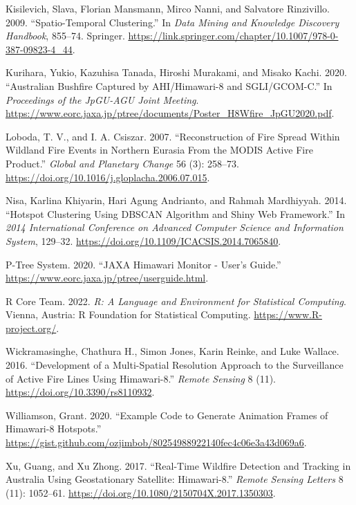 \begin{CSLReferences}{1}{0}
\leavevmode{}%
Kisilevich, Slava, Florian Mansmann, Mirco Nanni, and Salvatore Rinzivillo. 2009. {``{Spatio-Temporal Clustering}.''} In \emph{{Data Mining and Knowledge Discovery Handbook}}, 855--74. Springer. \url{https://link.springer.com/chapter/10.1007/978-0-387-09823-4_44}.

\leavevmode{}%
Kurihara, Yukio, Kazuhisa Tanada, Hiroshi Murakami, and Misako Kachi. 2020. {``{Australian Bushfire Captured by AHI/Himawari-8 and SGLI/GCOM-C}.''} In \emph{{Proceedings of the JpGU-AGU Joint Meeting}}. \url{https://www.eorc.jaxa.jp/ptree/documents/Poster_H8Wfire_JpGU2020.pdf}.

\leavevmode{}%
Loboda, T. V., and I. A. Csiszar. 2007. {``{Reconstruction of Fire Spread Within Wildland Fire Events in Northern Eurasia From the MODIS Active Fire Product}.''} \emph{{Global and Planetary Change}} 56 (3): 258--73. \url{https://doi.org/10.1016/j.gloplacha.2006.07.015}.

\leavevmode{}%
Nisa, Karlina Khiyarin, Hari Agung Andrianto, and Rahmah Mardhiyyah. 2014. {``{Hotspot Clustering Using DBSCAN Algorithm and Shiny Web Framework}.''} In \emph{{2014 International Conference on Advanced Computer Science and Information System}}, 129--32. \url{https://doi.org/10.1109/ICACSIS.2014.7065840}.

\leavevmode{}%
P-Tree System. 2020. {``{JAXA Himawari Monitor - User's Guide}.''} \url{https://www.eorc.jaxa.jp/ptree/userguide.html}.

\leavevmode{}%
R Core Team. 2022. \emph{R: A Language and Environment for Statistical Computing}. Vienna, Austria: R Foundation for Statistical Computing. \url{https://www.R-project.org/}.

\leavevmode{}%
Wickramasinghe, Chathura H., Simon Jones, Karin Reinke, and Luke Wallace. 2016. {``{Development of a Multi-Spatial Resolution Approach to the Surveillance of Active Fire Lines Using Himawari-8}.''} \emph{{Remote Sensing}} 8 (11). \url{https://doi.org/10.3390/rs8110932}.

\leavevmode{}%
Williamson, Grant. 2020. {``{Example Code to Generate Animation Frames of Himawari-8 Hotspots}.''} \url{https://gist.github.com/ozjimbob/80254988922140fec4c06e3a43d069a6}.

\leavevmode{}%
Xu, Guang, and Xu Zhong. 2017. {``{Real-Time Wildfire Detection and Tracking in Australia Using Geostationary Satellite: Himawari-8}.''} \emph{{Remote Sensing Letters}} 8 (11): 1052--61. \url{https://doi.org/10.1080/2150704X.2017.1350303}.

\end{CSLReferences}

